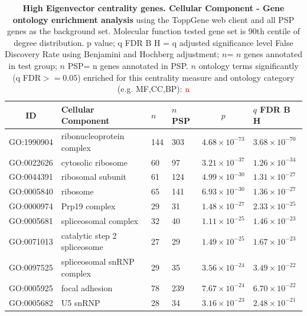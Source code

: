  \begin{table}[ht]
\centering
\begin{adjustbox}{width=\textwidth}
\setlength{\extrarowheight}{2pt}
\begin{tabular}{@{}clllcl@{}}
  \toprule
  ID & Cellular Component & $n$ & $n$ PSP & $p$ & $q$ FDR B H \\ 

  \midrule
GO:1990904 & ribonucleoprotein complex & 144 & 303 & $4.68 \times 10^{-73}$ & $3.68 \times 10^{-70}$ \\ 
  GO:0022626 & cytosolic ribosome & 60 & 97 & $3.21 \times 10^{-37}$ & $1.26 \times 10^{-34}$ \\ 
  GO:0044391 & ribosomal subunit & 61 & 124 & $4.99 \times 10^{-30}$ & $1.31 \times 10^{-27}$ \\ 
  GO:0005840 & ribosome & 65 & 141 & $6.93 \times 10^{-30}$ & $1.36 \times 10^{-27}$ \\ 
  GO:0000974 & Prp19 complex & 29 & 31 & $1.48 \times 10^{-27}$ & $2.33 \times 10^{-25}$ \\ 
  GO:0005681 & spliceosomal complex & 32 & 40 & $1.11 \times 10^{-25}$ & $1.46 \times 10^{-23}$ \\ 
  GO:0071013 & catalytic step 2 spliceosome & 27 & 29 & $1.49 \times 10^{-25}$ & $1.67 \times 10^{-23}$ \\ 
  GO:0097525 & spliceosomal snRNP complex & 29 & 35 & $3.56 \times 10^{-24}$ & $3.49 \times 10^{-22}$ \\ 
  GO:0005925 & focal adhesion & 78 & 239 & $7.67 \times 10^{-24}$ & $6.70 \times 10^{-22}$ \\ 
  GO:0005682 & U5 snRNP & 28 & 34 & $3.16 \times 10^{-23}$ & $2.48 \times 10^{-21}$ \\ 
   \bottomrule
\end{tabular}
\end{adjustbox}
\caption[Gene ontology enrichment High Eigenvector centrality genes Cellular Component of genes above 90th centile of distribution]{\textbf{High Eigenvector centrality genes. Cellular Component - Gene ontology enrichment analysis} using the ToppGene web client and all PSP genes as the background set.  Molecular function tested gene set is 90th centile of degree distribution.  p value; q FDR B H = q adjusted significance level False Discovery Rate using Benjamini and Hochberg adjustment; $n$= $n$ genes annotated in test group; $n$ PSP= n genes annotated in PSP. $n$ ontology terms significantly (q FDR$>=0.05$) enriched for this centrality measure and ontology category (e.g. MF,CC,BP): \textcolor{red}{n}} 

\label{tab:ToppGENE GO: Cellular Component. 90 centile cw psp eig.txtp = p value; q FDR B H = q adjusted significance level False Discovery Rate using Benjamini and Hochberg adjustment; n= n genes annotated in test group; n PSP= n genes annotated in PSP}
\end{table}

